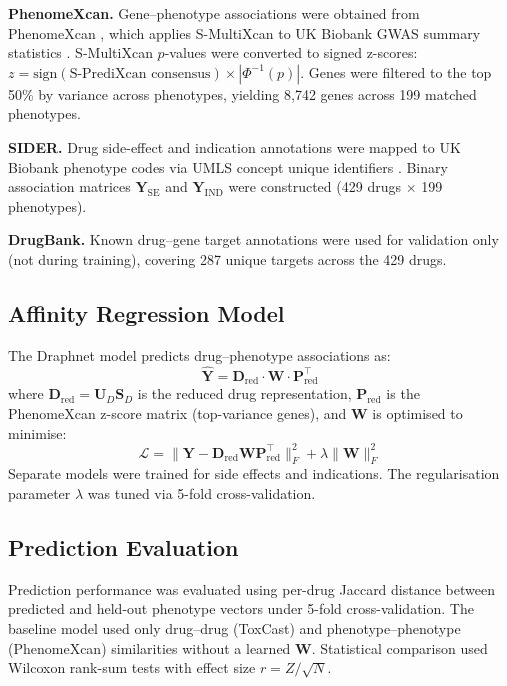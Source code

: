 \documentclass[11pt]{article}
\begin{document}
\textbf{PhenomeXcan.} Gene--phenotype associations were obtained from PhenomeXcan \citep{pividori2020phenomexcan}, which applies S-MultiXcan \citep{barbeira2018exploring} to UK Biobank GWAS summary statistics \citep{bycroft2018uk}. S-MultiXcan $p$-values were converted to signed z-scores: $z = \mathrm{sign}(\text{S-PrediXcan consensus}) \times |\Phi^{-1}(p)|$. Genes were filtered to the top 50\% by variance across phenotypes, yielding 8,742 genes across 199 matched phenotypes.

\textbf{SIDER.} Drug side-effect and indication annotations \citep{kuhn2016sider} were mapped to UK Biobank phenotype codes via UMLS concept unique identifiers \citep{bodenreider2004unified}. Binary association matrices $\mathbf{Y}_{\mathrm{SE}}$ and $\mathbf{Y}_{\mathrm{IND}}$ were constructed (429 drugs $\times$ 199 phenotypes).

\textbf{DrugBank.} Known drug--gene target annotations \citep{wishart2018drugbank} were used for validation only (not during training), covering 287 unique targets across the 429 drugs.

\subsection{Affinity Regression Model}

The Draphnet model predicts drug--phenotype associations as:
\begin{equation}
\hat{\mathbf{Y}} = \mathbf{D}_{\mathrm{red}} \cdot \mathbf{W} \cdot \mathbf{P}_{\mathrm{red}}^\top
\end{equation}
where $\mathbf{D}_{\mathrm{red}} = \mathbf{U}_D \mathbf{S}_D$ is the reduced drug representation, $\mathbf{P}_{\mathrm{red}}$ is the PhenomeXcan z-score matrix (top-variance genes), and $\mathbf{W}$ is optimised to minimise:
\begin{equation}
\mathcal{L} = \|\mathbf{Y} - \mathbf{D}_{\mathrm{red}} \mathbf{W} \mathbf{P}_{\mathrm{red}}^\top\|_F^2 + \lambda \|\mathbf{W}\|_F^2
\end{equation}
Separate models were trained for side effects and indications. The regularisation parameter $\lambda$ was tuned via 5-fold cross-validation.

\subsection{Prediction Evaluation}

Prediction performance was evaluated using per-drug Jaccard distance between predicted and held-out phenotype vectors under 5-fold cross-validation. The baseline model used only drug--drug (ToxCast) and phenotype--phenotype (PhenomeXcan) similarities without a learned $\mathbf{W}$. Statistical comparison used Wilcoxon rank-sum tests with effect size $r = Z / \sqrt{N}$.
\end{document}
